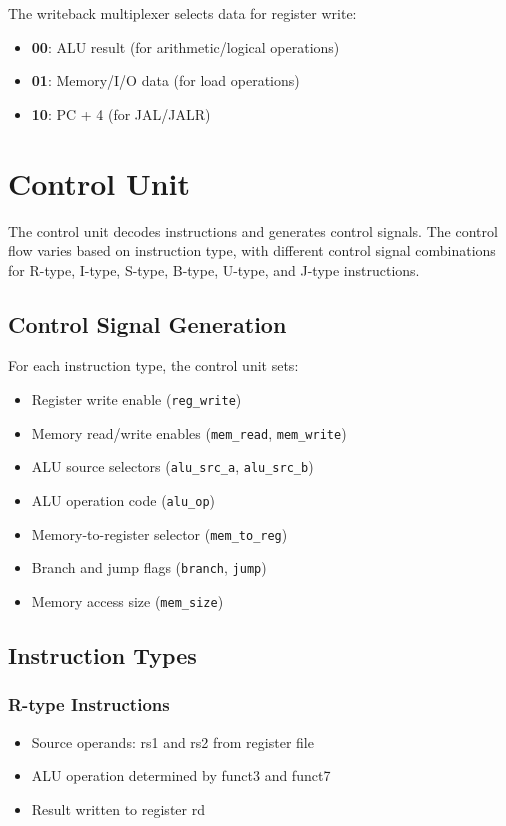 The writeback multiplexer selects data for register write:

\begin{itemize}
    \item \textbf{00}: ALU result (for arithmetic/logical operations)
    \item \textbf{01}: Memory/I/O data (for load operations)
    \item \textbf{10}: PC + 4 (for JAL/JALR)
\end{itemize}

\section{Control Unit}

The control unit decodes instructions and generates control signals. The control flow varies based on instruction type, with different control signal combinations for R-type, I-type, S-type, B-type, U-type, and J-type instructions.

\subsection{Control Signal Generation}

For each instruction type, the control unit sets:

\begin{itemize}
    \item Register write enable (\texttt{reg\_write})
    \item Memory read/write enables (\texttt{mem\_read}, \texttt{mem\_write})
    \item ALU source selectors (\texttt{alu\_src\_a}, \texttt{alu\_src\_b})
    \item ALU operation code (\texttt{alu\_op})
    \item Memory-to-register selector (\texttt{mem\_to\_reg})
    \item Branch and jump flags (\texttt{branch}, \texttt{jump})
    \item Memory access size (\texttt{mem\_size})
\end{itemize}

\subsection{Instruction Types}

\subsubsection{R-type Instructions}
\begin{itemize}
    \item Source operands: rs1 and rs2 from register file
    \item ALU operation determined by funct3 and funct7
    \item Result written to register rd
\end{itemize}

